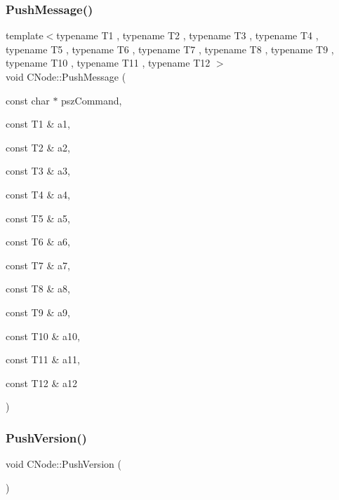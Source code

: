 \subsubsection{\texorpdfstring{Push\+Message()}{PushMessage()}\hspace{0.1cm}{\footnotesize\ttfamily [13/13]}}
{\footnotesize\ttfamily template$<$typename T1 , typename T2 , typename T3 , typename T4 , typename T5 , typename T6 , typename T7 , typename T8 , typename T9 , typename T10 , typename T11 , typename T12 $>$ \\
void C\+Node\+::\+Push\+Message (\begin{DoxyParamCaption}\item[{const char $\ast$}]{psz\+Command,  }\item[{const T1 \&}]{a1,  }\item[{const T2 \&}]{a2,  }\item[{const T3 \&}]{a3,  }\item[{const T4 \&}]{a4,  }\item[{const T5 \&}]{a5,  }\item[{const T6 \&}]{a6,  }\item[{const T7 \&}]{a7,  }\item[{const T8 \&}]{a8,  }\item[{const T9 \&}]{a9,  }\item[{const T10 \&}]{a10,  }\item[{const T11 \&}]{a11,  }\item[{const T12 \&}]{a12 }\end{DoxyParamCaption})\hspace{0.3cm}{\ttfamily [inline]}}

\mbox{\label{class_c_node_a4dbfe4f6c1fd162aaa905e4bd201d536}} 
\subsubsection{\texorpdfstring{Push\+Version()}{PushVersion()}}
{\footnotesize\ttfamily void C\+Node\+::\+Push\+Version (\begin{DoxyParamCaption}{ }\end{DoxyParamCaption})}

\mbox{\label{class_c_node_a84a10eb3aec7fdddafeb354527b50b75}} 
